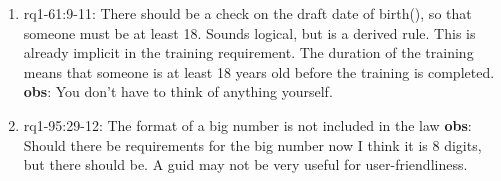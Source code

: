 \begin{enumerate}
    \item rq1-61:9-11: There should be a check on the draft date of birth(), so that someone must be at least 18.
    Sounds logical, but is a derived rule.
    This is already implicit in the training requirement.
    The duration of the training means that someone is at least 18 years old before the training is completed.
    \newline\textbf{obs}: You don't have to think of anything yourself.
    
    \item rq1-95:29-12: The format of a  big number is not included in the law
    \newline\textbf{obs}: Should there be requirements for the big number now I think it is 8 digits, but there should be.
    A guid may not be very useful for user-friendliness.
\end{enumerate}


\newpage
